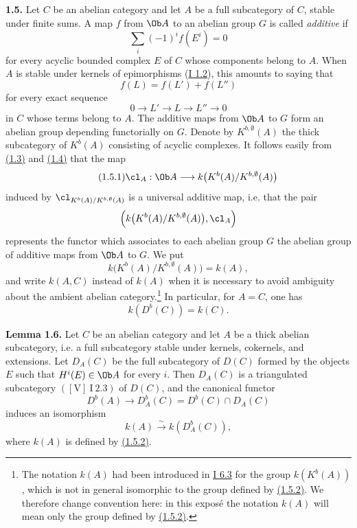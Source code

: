 \textbf{1.5.} Let \(C\) be an abelian category and let \(A\) be a full subcategory of \(C\), stable under finite sums. A map \(f\) from \(\Ob A\) to an abelian group \(G\) is called \emph{additive} if
\[
 \sum_i(-1)^i f(E^i)=0
\]
for every acyclic bounded complex \(E\) of \(C\) whose components belong to \(A\). When \(A\) is stable under kernels of epimorphisms (\hyperlink{sga6.e01.sec.1.2}{I 1.2}), this amounts to saying that
\[
 f(L)=f(L')+f(L'')
\]
for every exact sequence
\[
 0\longrightarrow L'\longrightarrow L\longrightarrow L''\longrightarrow0
\]
in \(C\) whose terms belong to \(A\). The additive maps from \(\Ob A\) to \(G\) form an abelian group depending functorially on \(G\). Denote by \(K^{b,\emptyset}(A)\) the thick subcategory of \(K^b(A)\) consisting of acyclic complexes. It follows easily from \hyperlink{sga6.e04.lem.1-3}{(1.3)} and \hyperlink{sga6.e04.lem.1-4}{(1.4)} that the map
\begin{equation}\tag{1.5.1}
 \cl_A:\Ob A\longrightarrow k\bigl(K^b(A)/K^{b,\emptyset}(A)\bigr)
\end{equation}
induced by \(\cl_{K^b(A)/K^{b,\emptyset}(A)}\) is a universal additive map, i.e. that the pair
\[
 \left(k\bigl(K^b(A)/K^{b,\emptyset}(A)\bigr),\cl_A\right)
\]
represents the functor which associates to each abelian group \(G\) the abelian group of additive maps from \(\Ob A\) to \(G\). We put
\begin{equation}\tag{1.5.2}
 k\bigl(K^b(A)/K^{b,\emptyset}(A)\bigr)=k(A),
\end{equation}
and write \(k(A,C)\) instead of \(k(A)\) when it is necessary to avoid ambiguity about the ambient abelian category.\footnote{The notation \(k(A)\) had been introduced in \hyperlink{sga6.e01.para.6-3}{I 6.3} for the group \(k(K^b(A))\), which is not in general isomorphic to the group defined by \hyperlink{sga6.e04.eq.1-5-2}{(1.5.2)}. We therefore change convention here: in this exposé the notation \(k(A)\) will mean only the group defined by \hyperlink{sga6.e04.eq.1-5-2}{(1.5.2)}.}
In particular, for \(A=C\), one has
\begin{equation}\tag{1.5.3}
 k(D^b(C))=k(C).
\end{equation}

\textbf{Lemma 1.6.} Let \(C\) be an abelian category and let \(A\) be a thick abelian subcategory, i.e. a full subcategory stable under kernels, cokernels, and extensions. Let \(D_A(C)\) be the full subcategory of \(D(C)\) formed by the objects \(E\) such that \(H^i(E)\in\Ob A\) for every \(i\). Then \(D_A(C)\) is a triangulated subcategory \(([\mathrm V]\ \mathrm I\ 2.3)\) of \(D(C)\), and the canonical functor
\[
 D^b(A)\longrightarrow D_A^b(C)=D^b(C)\cap D_A(C)
\]
induces an isomorphism
\[
 k(A)\xrightarrow{\sim} k(D_A^b(C)),
\]
where \(k(A)\) is defined by \hyperlink{sga6.e04.eq.1-5-2}{(1.5.2)}.

